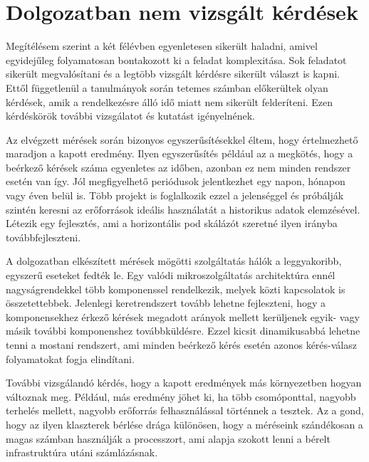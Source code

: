 \section{Dolgozatban nem vizsgált kérdések}
Megítélésem szerint a két félévben egyenletesen sikerült haladni, amivel egyidejűleg folyamatosan bontakozott ki a feladat komplexitása.
Sok feladatot sikerült megvalósítani és a legtöbb vizsgált kérdésre sikerült választ is kapni.
Ettől függetlenül a tanulmányok során tetemes számban előkerültek olyan kérdések, amik a rendelkezésre álló idő miatt nem sikerült felderíteni.
Ezen kérdéskörök további vizsgálatot és kutatást igényelnének.

Az elvégzett mérések során bizonyos egyszerűsítésekkel éltem, hogy értelmezhető maradjon a kapott eredmény.
Ilyen egyszerűsítés például az a megkötés, hogy a beérkező kérések száma egyenletes az időben, azonban ez nem minden rendszer esetén van így.
Jól megfigyelhető periódusok jelentkezhet egy napon, hónapon vagy éven belül is.
Több projekt is foglalkozik ezzel a jelenséggel és próbálják szintén keresni az erőforrások ideális használatát a historikus adatok elemzésével.
Létezik egy fejlesztés, ami a horizontális pod skálázót szeretné ilyen irányba továbbfejleszteni\citep{predictiveHPAGithub}.

A dolgozatban elkészített mérések mögötti szolgáltatás hálók a leggyakoribb, egyszerű eseteket fedték le.
Egy valódi mikroszolgáltatás architektúra ennél nagyságrendekkel több komponenssel rendelkezik, melyek közti kapcsolatok is összetettebbek.
Jelenlegi keretrendszert tovább lehetne fejleszteni, hogy a komponensekhez érkező kérések megadott arányok mellett kerüljenek egyik- vagy másik további komponenshez továbbküldésre.
Ezzel kicsit dinamikusabbá lehetne tenni a mostani rendszert, ami minden beérkező kérés esetén azonos kérés-válasz folyamatokat fogja elindítani.

További vizsgálandó kérdés, hogy a kapott eredmények más környezetben hogyan változnak meg.
Például, más eredmény jöhet ki, ha több csomóponttal, nagyobb terhelés mellett, nagyobb erőforrás felhasználással történnek a tesztek.
Az a gond, hogy az ilyen klaszterek bérlése drága különösen, hogy a méréseink szándékosan a magas számban használják a processzort, ami alapja szokott lenni a bérelt infrastruktúra utáni számlázásnak.


